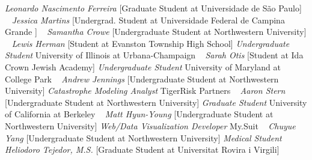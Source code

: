 \textit{Leonardo Nascimento Ferreira}
    [Graduate Student at Universidade de S\~ao Paulo]
\newline
~
\Gap{}
\textit{Jessica Martins}
    [Undergrad. Student at Universidade Federal de Campina Grande ]
\newline
~
\Gap{}
\textit{Samantha Crowe}
    [Undergraduate Student at Northwestern University]
\newline
~
\Gap{}
\textit{Lewis Herman}
    [Student at Evanston Township High School]
\newline
    \textit{Undergraduate Student}
    \newline
    University of Illinois at Urbana-Champaign
    \newline
~
\Gap{}
\textit{Sarah Otis}
    [Student at Ida Crown Jewish Academy]
\newline
    \textit{Undergraduate Student}
    \newline
    University of Maryland at College Park
    \newline
~
\Gap{}
\textit{Andrew Jennings}
    [Undergraduate Student at Northwestern University]
\newline
    \textit{Catastrophe Modeling Analyst}
    \newline
    TigerRisk Partners
    \newline
~
\Gap{}
\textit{Aaron Stern}
    [Undergraduate Student at Northwestern University]
\newline
    \textit{Graduate Student}
    \newline
    University of California at Berkeley
    \newline
~
\Gap{}
\textit{Matt Hyun-Young}
    [Undergraduate Student at Northwestern University]
\newline
    \textit{Web/Data Visualization Developer}
    \newline
    My.Suit
    \newline
~
\Gap{}
\textit{Chuyue Yang}
    [Undergraduate Student at Northwestern University]
\newline
    \textit{Medical Student}
    \newline
~
\Gap{}
\textit{Heliodoro Tejedor, M.S.}
    [Graduate Student at Universitat Rovira i Virgili]
